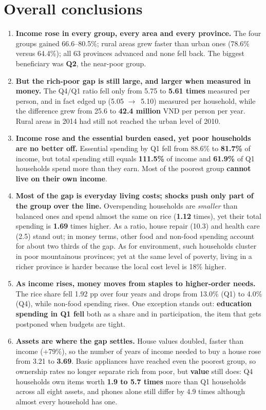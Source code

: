 \documentclass[11pt,a4paper]{article}
\newcommand{\ra}{$\rightarrow$}
\newcommand{\n}[1]{\textbf{#1}}
\begin{document}
\section{Overall conclusions}

\begin{enumerate}[leftmargin=1.5em,itemsep=6pt,topsep=3pt]
\item \n{Income rose in every group, every area and every province.} The four groups gained 66.6–80.5\%; rural areas grew faster than urban ones (78.6\% versus 64.4\%); all 63 provinces advanced and none fell back. The biggest beneficiary was \n{Q2}, the near-poor group.

\item \n{But the rich-poor gap is still large, and larger when measured in money.} The Q4/Q1 ratio fell only from 5.75 to \n{5.61 times} measured per person, and in fact edged up (5.05 \ra\ 5.10) measured per household, while the difference grew from 25.6 to \n{42.4 million} VND per person per year. Rural areas in 2014 had still not reached the urban level of 2010.

\item \n{Income rose and the essential burden eased, yet poor households are no better off.} Essential spending by Q1 fell from 88.6\% to \n{81.7\%} of income, but total spending still equals \n{111.5\%} of income and \n{61.9\%} of Q1 households spend more than they earn. Most of the poorest group \n{cannot live on their own income}.

\item \n{Most of the gap is everyday living costs; shocks push only part of the group over the line.} Overspending households are \emph{smaller} than balanced ones and spend almost the same on rice (\n{1.12} times), yet their total spending is \n{1.69} times higher. As a ratio, house repair (10.3) and health care (2.5) stand out; in money terms, other food and non-food spending account for about two thirds of the gap. As for environment, such households cluster in poor mountainous provinces; yet at the same level of poverty, living in a richer province is harder because the local cost level is 18\% higher.

\item \n{As income rises, money moves from staples to higher-order needs.} The rice share fell 1.92 pp over four years and drops from 13.0\% (Q1) to 4.0\% (Q4), while non-food spending rises. One exception stands out: \n{education spending in Q1 fell} both as a share and in participation, the item that gets postponed when budgets are tight.

\item \n{Assets are where the gap settles.} House values doubled, faster than income ($+79\%$), so the number of years of income needed to buy a house rose from 3.21 to \n{3.69}. Basic appliances have reached even the poorest group, so ownership rates no longer separate rich from poor, but \n{value} still does: Q4 households own items worth \n{1.9 to 5.7 times} more than Q1 households across all eight assets, and phones alone still differ by 4.9 times although almost every household has one.
\end{enumerate}
\end{document}
